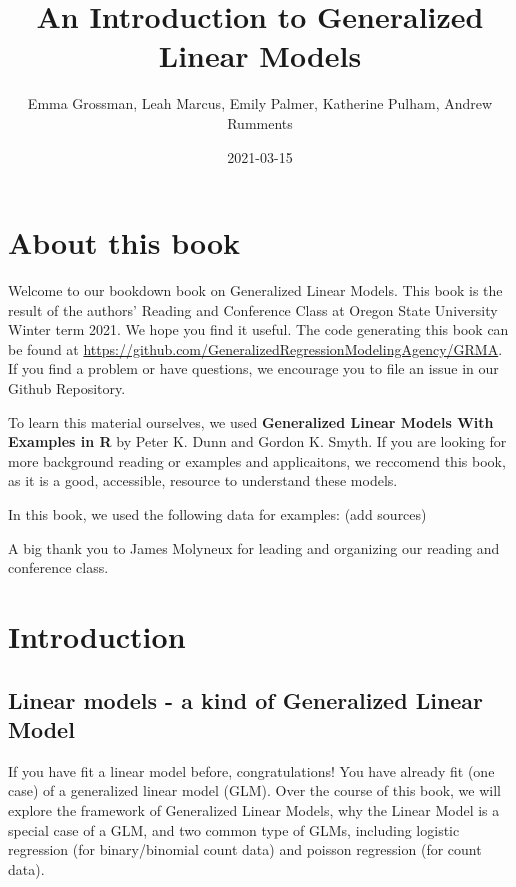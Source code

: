 \documentclass[
]{book}
\title{An Introduction to Generalized Linear Models}
\author{Emma Grossman, Leah Marcus, Emily Palmer, Katherine Pulham, Andrew Rumments}
\date{2021-03-15}
\begin{document}
\maketitle

{
\setcounter{tocdepth}{1}
\tableofcontents
}
\hypertarget{about-this-book}{%
\chapter{About this book}\label{about-this-book}}

Welcome to our bookdown book on Generalized Linear Models. This book is the result of the authors' Reading and Conference Class at Oregon State University Winter term 2021. We hope you find it useful. The code generating this book can be found at \url{https://github.com/GeneralizedRegressionModelingAgency/GRMA}. If you find a problem or have questions, we encourage you to file an issue in our Github Repository.

To learn this material ourselves, we used \textbf{Generalized Linear Models With Examples in R} by Peter K. Dunn and Gordon K. Smyth\citep{dunn2018generalized}. If you are looking for more background reading or examples and applicaitons, we reccomend this book, as it is a good, accessible, resource to understand these models.

In this book, we used the following data for examples: (add sources)

A big thank you to James Molyneux for leading and organizing our reading and conference class.

\hypertarget{intro}{%
\chapter{Introduction}\label{intro}}

\hypertarget{linear-models---a-kind-of-generalized-linear-model}{%
\section{Linear models - a kind of Generalized Linear Model}\label{linear-models---a-kind-of-generalized-linear-model}}

If you have fit a linear model before, congratulations! You have already fit (one case) of a generalized linear model (GLM). Over the course of this book, we will explore the framework of Generalized Linear Models, why the Linear Model is a special case of a GLM, and two common type of GLMs, including logistic regression (for binary/binomial count data) and poisson regression (for count data).
\end{document}
